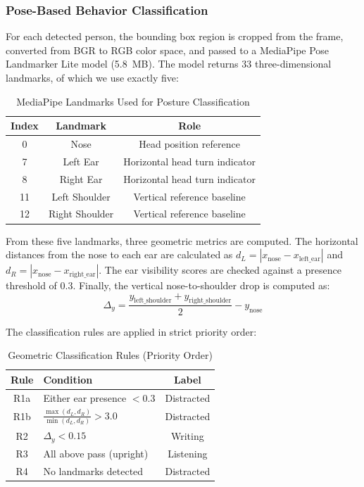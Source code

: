 \documentclass[conference]{IEEEtran}
\begin{document}
\subsubsection{Pose-Based Behavior Classification}
For each detected person, the bounding box region is cropped from the frame, converted from BGR to RGB color space, and passed to a MediaPipe Pose Landmarker Lite model \cite{b2} (5.8~MB). The model returns 33 three-dimensional landmarks, of which we use exactly five:

\begin{table}[htbp]
\caption{MediaPipe Landmarks Used for Posture Classification}
\begin{center}
\begin{tabular}{|c|c|c|}
\hline
\textbf{Index} & \textbf{Landmark} & \textbf{Role} \\
\hline
0 & Nose & Head position reference \\
7 & Left Ear & Horizontal head turn indicator \\
8 & Right Ear & Horizontal head turn indicator \\
11 & Left Shoulder & Vertical reference baseline \\
12 & Right Shoulder & Vertical reference baseline \\
\hline
\end{tabular}
\label{tab:landmarks}
\end{center}
\end{table}

From these five landmarks, three geometric metrics are computed. The horizontal distances from the nose to each ear are calculated as $d_L = |x_{\text{nose}} - x_{\text{left\_ear}}|$ and $d_R = |x_{\text{nose}} - x_{\text{right\_ear}}|$. The ear visibility scores are checked against a presence threshold of 0.3. Finally, the vertical nose-to-shoulder drop is computed as:
\begin{equation}
\Delta_y = \frac{y_{\text{left\_shoulder}} + y_{\text{right\_shoulder}}}{2} - y_{\text{nose}}
\label{eq:drop}
\end{equation}

The classification rules are applied in strict priority order:

\begin{table}[htbp]
\caption{Geometric Classification Rules (Priority Order)}
\begin{center}
\begin{tabular}{|c|p{4.2cm}|c|}
\hline
\textbf{Rule} & \textbf{Condition} & \textbf{Label} \\
\hline
R1a & Either ear presence $< 0.3$ & Distracted \\
\hline
R1b & $\frac{\max(d_L, d_R)}{\min(d_L, d_R)} > 3.0$ & Distracted \\
\hline
R2 & $\Delta_y < 0.15$ & Writing \\
\hline
R3 & All above pass (upright) & Listening \\
\hline
R4 & No landmarks detected & Distracted \\
\hline
\end{tabular}
\label{tab:rules}
\end{center}
\end{table}
\end{document}
